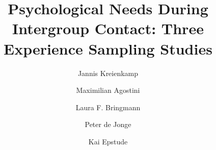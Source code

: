 \documentclass[man, 12pt, a4paper, donotrepeattitle]{apa7}
\title{Psychological Needs During Intergroup Contact: Three Experience Sampling Studies}
\author[*,1]{Jannis Kreienkamp}
\author[1]{Maximilian Agostini}
\author[1]{Laura F. Bringmann}
\author[1]{Peter de Jonge}
\author[1]{Kai Epstude}
\affiliation{\hfill}
\affil[1]{University of Groningen, Department of Psychology}
\begin{document}

\makeatletter
\vspace*{3em}
\begin{center}
\noindent \textbf\@title
\vspace{1em}
\noindent \@author
\end{center}
\vspace{6em}
\begin{center}%
    \textbf\acksname%
\end{center}%
\vspace{-1em}
\protect\raggedright
\setlength{\parindent}{0.5in}
\indent\par\@acks%

\printbibliography
\end{document}
